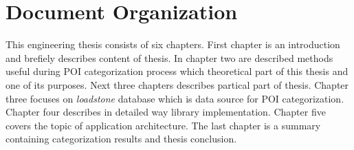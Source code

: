 \section{Document Organization}
This engineering thesis consists of six chapters. First chapter is an introduction and brefiely describes content of thesis. In chapter two are described methods useful during POI categorization process which theoretical part of this thesis and one of its purposes. Next three chapters describes partical part of thesis. Chapter three focuses on \textit{loadstone} database which is data source for POI categorization. Chapter four describes in detailed way library implementation. Chapter five covers the topic of application architecture. The last chapter is a summary containing categorization results and thesis conclusion.